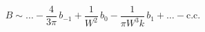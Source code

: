 \begin{equation}
  B \sim  \ldots  -\frac{4 }{3 \pi} \,b_{-1} + \frac{1}{W^2}\, b_{0} 
  -\frac{1}{\pi W^3 k}\, b_{1} +\ldots - \text{c.c.}
\end{equation}

